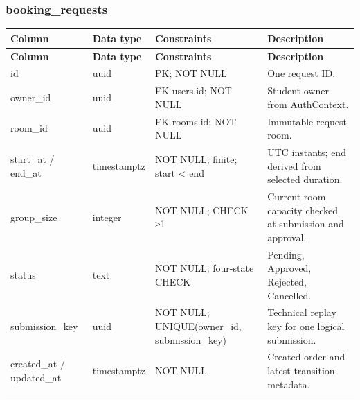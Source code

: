 \subsubsection{booking\allowbreak\_\allowbreak{}requests}

\begin{longtable}{|p{}|p{}|p{}|p{}|}

\hline

\textbf{Column} & \textbf{Data type} & \textbf{Constraints} & \textbf{Description} \\ \hline

\endfirsthead

\hline

\textbf{Column} & \textbf{Data type} & \textbf{Constraints} & \textbf{Description} \\ \hline

\endhead

id & uuid & PK; NOT NULL & One request ID. \\ \hline

owner\allowbreak\_\allowbreak{}id & uuid & FK users.id; NOT NULL & Student owner from AuthContext. \\ \hline

room\allowbreak\_\allowbreak{}id & uuid & FK rooms.id; NOT NULL & Immutable request room. \\ \hline

start\allowbreak\_\allowbreak{}at /\allowbreak{} end\allowbreak\_\allowbreak{}at & timestamptz & NOT NULL; finite; start < end & UTC instants; end derived from selected duration. \\ \hline

group\allowbreak\_\allowbreak{}size & integer & NOT NULL; CHECK ≥1 & Current room capacity checked at submission and approval. \\ \hline

status & text & NOT NULL; four-state CHECK & Pending, Approved, Rejected, Cancelled. \\ \hline

submission\allowbreak\_\allowbreak{}key & uuid & NOT NULL; UNIQUE(owner\allowbreak\_\allowbreak{}id, submission\allowbreak\_\allowbreak{}key) & Technical replay key for one logical submission. \\ \hline

created\allowbreak\_\allowbreak{}at /\allowbreak{} updated\allowbreak\_\allowbreak{}at & timestamptz & NOT NULL & Created order and latest transition metadata. \\ \hline


\end{longtable}
